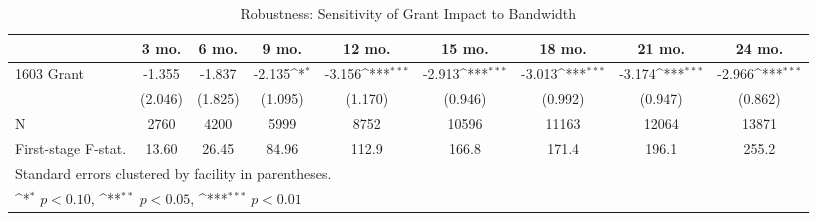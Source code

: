 \begin{table}[htbp]\centering
\def\sym#1{\ifmmode^{#1}\else\(^{#1}\)\fi}
\caption{Robustness: Sensitivity of Grant Impact to Bandwidth\label{RDD:logCFbandwidth}}
\begin{tabular}{l*{8}{c}}
\hline\hline
                    &\multicolumn{1}{c}{3 mo.}&\multicolumn{1}{c}{6 mo.}&\multicolumn{1}{c}{9 mo.}&\multicolumn{1}{c}{12 mo.}&\multicolumn{1}{c}{15 mo.}&\multicolumn{1}{c}{18 mo.}&\multicolumn{1}{c}{21 mo.}&\multicolumn{1}{c}{24 mo.}\\
\hline
1603 Grant          &      -1.355         &      -1.837         &      -2.135\sym{*}  &      -3.156\sym{***}&      -2.913\sym{***}&      -3.013\sym{***}&      -3.174\sym{***}&      -2.966\sym{***}\\
                    &     (2.046)         &     (1.825)         &     (1.095)         &     (1.170)         &     (0.946)         &     (0.992)         &     (0.947)         &     (0.862)         \\
\hline
N                   &        2760         &        4200         &        5999         &        8752         &       10596         &       11163         &       12064         &       13871         \\
First-stage F-stat. &       13.60         &       26.45         &       84.96         &       112.9         &       166.8         &       171.4         &       196.1         &       255.2         \\
\hline\hline
\multicolumn{9}{l}{\footnotesize Standard errors clustered by facility in parentheses.}\\
\multicolumn{9}{l}{\footnotesize \sym{*} \(p<0.10\), \sym{**} \(p<0.05\), \sym{***} \(p<0.01\)}\\
\end{tabular}
\end{table}

